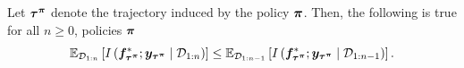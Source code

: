 \begin{lemma}
\label{lemma:info_never_hurts} Let ${\bm{\tau}}^{{\bm{\pi}}}$ denote the trajectory induced by the policy ${\bm{\pi}}$. Then, the following is true for all $n \geq 0$, policies ${\bm{\pi}}$
\begin{equation*}
   \mathbb{E}_{{\mathcal{D}}_{1:n}}\left[I\left({\bm{f}}^*_{{\bm{\tau}}^{{\bm{\pi}}}}; {\bm{y}}_{{\bm{\tau}}^{{\bm{\pi}}}} \mid {\mathcal{D}}_{1:n}\right)\right] \leq   \mathbb{E}_{{\mathcal{D}}_{1:n-1}}\left[I\left({\bm{f}}^*_{{\bm{\tau}}^{{\bm{\pi}}}}; {\bm{y}}_{{\bm{\tau}}^{{\bm{\pi}}}} \mid {\mathcal{D}}_{1:n-1}\right)\right]. 
\end{equation*}
\end{lemma}
